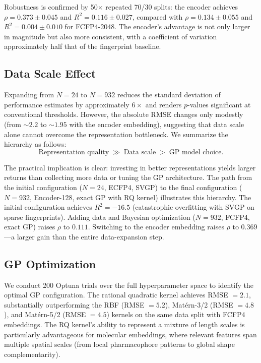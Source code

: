 \documentclass{article}
\begin{document}
Robustness is confirmed by 50$\times$ repeated 70/30 splits: the encoder
achieves $\rho = 0.373 \pm 0.045$ and $R^{2} = 0.116 \pm 0.027$,
compared with $\rho = 0.134 \pm 0.055$ and $R^{2} = 0.004 \pm 0.010$
for FCFP4-2048.  The encoder's advantage is not only larger in magnitude
but also more consistent, with a coefficient of variation approximately
half that of the fingerprint baseline.

\subsection{Data Scale Effect}

Expanding from $N = 24$ to $N = 932$ reduces the standard deviation of
performance estimates by approximately $6\times$ and renders $p$-values
significant at conventional thresholds.  However, the absolute RMSE
changes only modestly (from ${\sim}2.2$ to ${\sim}1.95$ with the encoder
embedding), suggesting that data scale alone cannot overcome the
representation bottleneck.  We summarize the hierarchy as follows:
\begin{equation*}
  \text{Representation quality}
  \;\gg\;
  \text{Data scale}
  \;>\;
  \text{GP model choice}.
\end{equation*}

The practical implication is clear: investing in better representations
yields larger returns than collecting more data or tuning the GP
architecture.  The path from the initial configuration ($N = 24$,
ECFP4, SVGP) to the final configuration ($N = 932$, Encoder-128, exact
GP with RQ kernel) illustrates this hierarchy.  The initial configuration
achieves $R^{2} = -16.5$ (catastrophic overfitting with SVGP on sparse
fingerprints).  Adding data and Bayesian optimization ($N = 932$, FCFP4,
exact GP) raises $\rho$ to $0.111$.  Switching to the encoder embedding
raises $\rho$ to $0.369$---a larger gain than the entire data-expansion
step.

\subsection{GP Optimization}

We conduct 200 Optuna trials over the full hyperparameter space to
identify the optimal GP configuration.  The rational quadratic kernel
achieves RMSE $= 2.1$, substantially outperforming the RBF
(RMSE $= 5.2$), Mat\'ern-3/2 (RMSE $= 4.8$), and Mat\'ern-5/2
(RMSE $= 4.5$) kernels on the same data split with FCFP4 embeddings.
The RQ kernel's ability to represent a mixture of length scales is
particularly advantageous for molecular embeddings, where relevant
features span multiple spatial scales (from local pharmacophore patterns
to global shape complementarity).
\end{document}
